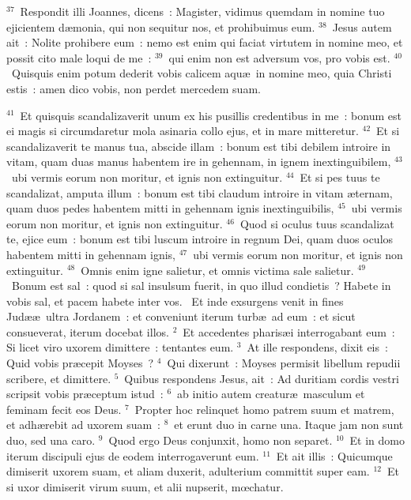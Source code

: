 ${}^{37}$~Respondit illi Joannes, dicens~: Magister, vidimus quemdam in nomine tuo ejicientem d\ae monia, qui non sequitur nos, et prohibuimus eum.
${}^{38}$~Jesus autem ait~: Nolite prohibere eum~: nemo est enim qui faciat virtutem in nomine meo, et possit cito male loqui de me~:
${}^{39}$~qui enim non est adversum vos, pro vobis est.
${}^{40}$~Quisquis enim potum dederit vobis calicem aqu\ae\ in nomine meo, quia Christi estis~: amen dico vobis, non perdet mercedem suam.


${}^{41}$~Et quisquis scandalizaverit unum ex his pusillis credentibus in me~: bonum est ei magis si circumdaretur mola asinaria collo ejus, et in mare mitteretur.
${}^{42}$~Et si scandalizaverit te manus tua, abscide illam~: bonum est tibi debilem introire in vitam, quam duas manus habentem ire in gehennam, in ignem inextinguibilem,
${}^{43}$~ubi vermis eorum non moritur, et ignis non extinguitur.
${}^{44}$~Et si pes tuus te scandalizat, amputa illum~: bonum est tibi claudum introire in vitam \ae ternam, quam duos pedes habentem mitti in gehennam ignis inextinguibilis,
${}^{45}$~ubi vermis eorum non moritur, et ignis non extinguitur.
${}^{46}$~Quod si oculus tuus scandalizat te, ejice eum~: bonum est tibi luscum introire in regnum Dei, quam duos oculos habentem mitti in gehennam ignis,
${}^{47}$~ubi vermis eorum non moritur, et ignis non extinguitur.
${}^{48}$~Omnis enim igne salietur, et omnis victima sale salietur.
${}^{49}$~Bonum est sal~: quod si sal insulsum fuerit, in quo illud condietis~? Habete in vobis sal, et pacem habete inter vos.
~Et inde exsurgens venit in fines Jud\ae \ae\ ultra Jordanem~: et conveniunt iterum turb\ae\ ad eum~: et sicut consueverat, iterum docebat illos.
${}^{2}$~Et accedentes pharis\ae i interrogabant eum~: Si licet viro uxorem dimittere~: tentantes eum.
${}^{3}$~At ille respondens, dixit eis~: Quid vobis pr\ae cepit Moyses~?
${}^{4}$~Qui dixerunt~: Moyses permisit libellum repudii scribere, et dimittere.
${}^{5}$~Quibus respondens Jesus, ait~: Ad duritiam cordis vestri scripsit vobis pr\ae ceptum istud~:
${}^{6}$~ab initio autem creatur\ae\ masculum et feminam fecit eos Deus.
${}^{7}$~Propter hoc relinquet homo patrem suum et matrem, et adh\ae rebit ad uxorem suam~:
${}^{8}$~et erunt duo in carne una. Itaque jam non sunt duo, sed una caro.
${}^{9}$~Quod ergo Deus conjunxit, homo non separet.
${}^{10}$~Et in domo iterum discipuli ejus de eodem interrogaverunt eum.
${}^{11}$~Et ait illis~: Quicumque dimiserit uxorem suam, et aliam duxerit, adulterium committit super eam.
${}^{12}$~Et si uxor dimiserit virum suum, et alii nupserit, mœchatur.


